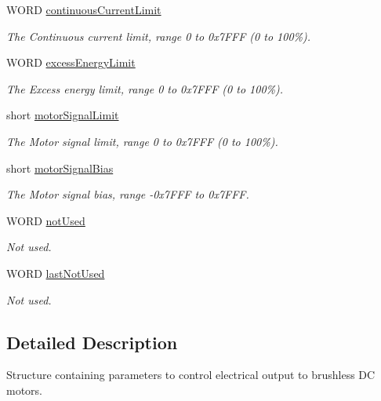 \begin{DoxyCompactItemize}
\item 
W\+O\+RD \hyperlink{struct_m_o_t___brushless_electric_output_parameters_a8332830883a21bdf73355796a0e2aa93}{continuous\+Current\+Limit}
\begin{DoxyCompactList}\small\item\em The Continuous current limit, range 0 to 0x7\+F\+FF (0 to 100\%). \end{DoxyCompactList}\item 
W\+O\+RD \hyperlink{struct_m_o_t___brushless_electric_output_parameters_aef6d314a62fdc6e7c03692ed5f3f46c7}{excess\+Energy\+Limit}
\begin{DoxyCompactList}\small\item\em The Excess energy limit, range 0 to 0x7\+F\+FF (0 to 100\%). \end{DoxyCompactList}\item 
short \hyperlink{struct_m_o_t___brushless_electric_output_parameters_a607a548bb74117502c1ff6bfb53888ba}{motor\+Signal\+Limit}
\begin{DoxyCompactList}\small\item\em The Motor signal limit, range 0 to 0x7\+F\+FF (0 to 100\%). \end{DoxyCompactList}\item 
short \hyperlink{struct_m_o_t___brushless_electric_output_parameters_a6e0a67140b181995f4c7a758a3713fa7}{motor\+Signal\+Bias}
\begin{DoxyCompactList}\small\item\em The Motor signal bias, range -\/0x7\+F\+FF to 0x7\+F\+FF. \end{DoxyCompactList}\item 
W\+O\+RD \hyperlink{struct_m_o_t___brushless_electric_output_parameters_a6d63e90879143baac1eaf70d6349b4d5}{not\+Used}
\begin{DoxyCompactList}\small\item\em Not used. \end{DoxyCompactList}\item 
W\+O\+RD \hyperlink{struct_m_o_t___brushless_electric_output_parameters_a4cf8c2263c04b073d89f606a901d1fe7}{last\+Not\+Used}
\begin{DoxyCompactList}\small\item\em Not used. \end{DoxyCompactList}\end{DoxyCompactItemize}


\subsection{Detailed Description}
Structure containing parameters to control electrical output to brushless DC motors. 



